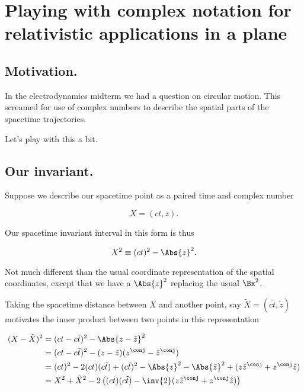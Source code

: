 
%

\chapter{Playing with complex notation for relativistic applications in a plane}
\label{chap:complexPlanarBoost}
{}
\date{Mar 8, 2011}

\beginArtNoToc

\section{Motivation.}

In the electrodynamics midterm we had a question on circular motion.  This screamed for use of complex numbers to describe the spatial parts of the spacetime trajectories.

Let's play with this a bit.

\section{Our invariant.}

Suppose we describe our spacetime point as a paired time and complex number

\begin{equation}\label{eqn:complexPlanarBoost:10}
X = (ct, z).
\end{equation}

Our spacetime invariant interval in this form is thus

\begin{equation}\label{eqn:complexPlanarBoost:30}
X^2 \equiv (ct)^2 - \Abs{z}^2.
\end{equation}

Not much different than the usual coordinate representation of the spatial coordinates, except that we have a $\Abs{z}^2$ replacing the usual $\Bx^2$.

Taking the spacetime distance between $X$ and another point, say $\tilde{X} = ( c \tilde{t}, \tilde{z})$ motivates the inner product between two points in this representation

\begin{align*}
(X - \tilde{X})^2 
&= (ct - c \tilde{t})^2 - \Abs{z - \tilde{z}}^2 \\
&= (ct - c \tilde{t})^2 - (z - \tilde{z})(z^\conj - \tilde{z}^\conj) \\
&= (ct)^2 - 2 (ct) (c \tilde{t}) + (c \tilde{t})^2 
- \Abs{z}^2 - \Abs{\tilde{z}}^2 + (z \tilde{z}^\conj + z^\conj \tilde{z}) \\
&= X^2 + \tilde{X}^2 - 2 \left( (ct) (c \tilde{t}) - \inv{2}(z \tilde{z}^\conj + z^\conj \tilde{z}) \right) \\
\end{align*}

